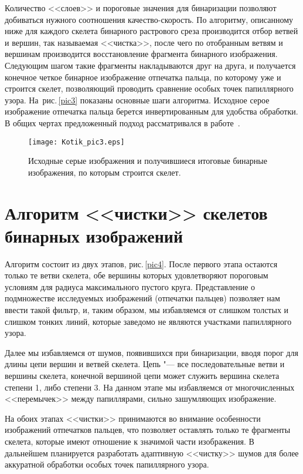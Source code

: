 \documentclass[twoside]{article}
\begin{document}
Количество <<слоев>> и пороговые значения для бинаризации позволяют добиваться нужного соотношения качество-скорость. По алгоритму, описанному ниже для каждого скелета бинарного растрового среза производится отбор ветвей и вершин, так называемая <<чистка>>, после чего по отобранным ветвям и вершинам производится восстановление фрагмента бинарного изображения. Следующим шагом такие фрагменты накладываются друг на друга, и получается конечное четкое бинарное изображение отпечатка пальца, по которому уже и строится скелет, позволяющий проводить сравнение особых точек папиллярного узора. На~рис.\,\ref{pic3} показаны основные шаги алгоритма. Исходное серое изображение отпечатка пальца берется инвертированным для удобства обработки. В общих чертах предложенный подход рассматривался в работе~\cite{bib5}.

\begin{figure}[t]
    \centering
    \texttt{[image: Kotik\_pic3.eps]}
    \caption{Исходные серые изображения и получившиеся итоговые бинарные изображения, по которым строится скелет.}
    \label{pic5}
\end{figure}

\section{Алгоритм <<чистки>> скелетов\\ бинарных изображений}
Алгоритм состоит из двух этапов, рис.\,\ref{pic4}. После первого этапа остаются только те ветви скелета, обе вершины которых удовлетворяют пороговым условиям для радиуса максимального пустого круга. Представление о подмножестве исследуемых изображений (отпечатки пальцев) позволяет нам ввести такой фильтр, и, таким образом, мы избавляемся от слишком толстых и слишком тонких линий, которые заведомо не являются участками папиллярного узора.

Далее мы избавляемся от шумов, появившихся при бинаризации, вводя порог для длины цепи вершин и ветвей скелета. Цепь "--- все последовательные ветви и вершины скелета, конечной вершиной цепи может служить  вершина скелета степени 1, либо степени 3. На данном этапе мы избавляемся от многочисленных <<перемычек>> между папиллярами, сильно зашумляющих изображение.

На обоих этапах <<чистки>> принимаются во внимание особенности изображений отпечатков пальцев, что позволяет оставлять только те фрагменты скелета, которые имеют отношение к значимой части изображения. В дальнейшем планируется разработать адаптивную <<чистку>> шумов для более аккуратной обработки особых точек папиллярного узора.
\end{document}
